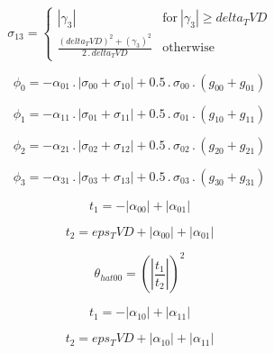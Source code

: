 \documentclass{article}
\begin{document}
\begin{dmath}\sigma_{1 3} = \begin{cases} \left|{\gamma_{3}}\right| & \text{for}\: \left|{\gamma_{3}}\right| \geq delta_TVD \\\frac{\left(delta_TVD \right)^{2} + \left(\gamma_{3} \right)^{2}}{2 \,.\, delta_TVD} & \text{otherwise} 
\end{cases}\end{dmath}

\begin{dmath}\phi_{0} = - \alpha_{01} \,.\, \left|{\sigma_{0 0} + \sigma_{1 0}}\right| + 0.5 \,.\, \sigma_{0 0} \,.\, \left(g_{00} + g_{01}\right)\end{dmath}

\begin{dmath}\phi_{1} = - \alpha_{11} \,.\, \left|{\sigma_{0 1} + \sigma_{1 1}}\right| + 0.5 \,.\, \sigma_{0 1} \,.\, \left(g_{10} + g_{11}\right)\end{dmath}

\begin{dmath}\phi_{2} = - \alpha_{21} \,.\, \left|{\sigma_{0 2} + \sigma_{1 2}}\right| + 0.5 \,.\, \sigma_{0 2} \,.\, \left(g_{20} + g_{21}\right)\end{dmath}

\begin{dmath}\phi_{3} = - \alpha_{31} \,.\, \left|{\sigma_{0 3} + \sigma_{1 3}}\right| + 0.5 \,.\, \sigma_{0 3} \,.\, \left(g_{30} + g_{31}\right)\end{dmath}

\begin{dmath}t_{1} = - \left|{\alpha_{00}}\right| + \left|{\alpha_{01}}\right|\end{dmath}

\begin{dmath}t_{2} = eps_TVD + \left|{\alpha_{00}}\right| + \left|{\alpha_{01}}\right|\end{dmath}

\begin{dmath}\theta_{hat 00} = \left(\left|{\frac{t_{1}}{t_{2}}}\right| \right)^{2}\end{dmath}

\begin{dmath}t_{1} = - \left|{\alpha_{10}}\right| + \left|{\alpha_{11}}\right|\end{dmath}

\begin{dmath}t_{2} = eps_TVD + \left|{\alpha_{10}}\right| + \left|{\alpha_{11}}\right|\end{dmath}
\end{document}
